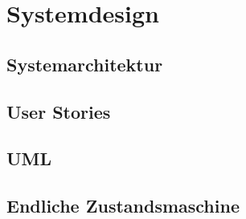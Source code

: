 \chapter{Systemdesign}
\label{sec:design}

\section{Systemarchitektur}
\label{sec:arch}


\section{User Stories}
\label{sec:design:user_stories}

\section{UML}
\label{sec:design:uml}


\section{Endliche Zustandsmaschine}
\label{sec:design:fsm}

